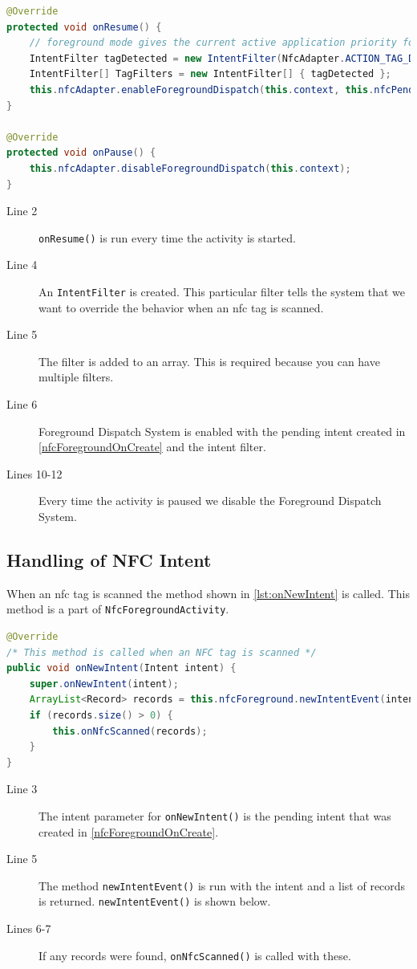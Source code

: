 \begin{lstlisting}[language=java, caption=Enable Foreground Dispatch System]
@Override
protected void onResume() {
	// foreground mode gives the current active application priority for reading scanned tags
	IntentFilter tagDetected = new IntentFilter(NfcAdapter.ACTION_TAG_DISCOVERED); 
	IntentFilter[] TagFilters = new IntentFilter[] { tagDetected };
	this.nfcAdapter.enableForegroundDispatch(this.context, this.nfcPendingIntent, TagFilters);
}

@Override
protected void onPause() {
    this.nfcAdapter.disableForegroundDispatch(this.context);
}
\end{lstlisting}
\begin{description}
\item[Line 2] \lstinline|onResume()| is run every time the activity is started.
\item[Line 4] An \lstinline|IntentFilter| is created. This particular filter tells the system that we want to override the behavior when an \ac{nfc} tag is scanned.
\item[Line 5] The filter is added to an array. This is required because you can have multiple filters.
\item[Line 6] Foreground Dispatch System is enabled with the pending intent created in \autoref{nfcForegroundOnCreate} and the intent filter.
\item[Lines 10-12] Every time the activity is paused we disable the Foreground Dispatch System.
\end{description}

\subsection*{Handling of NFC Intent}
When an \ac{nfc} tag is scanned the method shown in \autoref{lst:onNewIntent} is called. This method is a part of \lstinline|NfcForegroundActivity|.
\begin{lstlisting}[language=java, label=lst:onNewIntent, caption=\lstinline|onNewIntent()| method]
@Override
/* This method is called when an NFC tag is scanned */
public void onNewIntent(Intent intent) { 
    super.onNewIntent(intent);
    ArrayList<Record> records = this.nfcForeground.newIntentEvent(intent);
    if (records.size() > 0) {
        this.onNfcScanned(records);
    }
}  
\end{lstlisting}
\begin{description}
\item[Line 3] The intent parameter for \lstinline|onNewIntent()| is the pending intent that was created in \autoref{nfcForegroundOnCreate}.
\item[Line 5] The method \lstinline|newIntentEvent()| is run with the intent and a list of records is returned. \lstinline|newIntentEvent()| is shown below.
\item[Lines 6-7] If any records were found, \lstinline|onNfcScanned()| is called with these.
\end{description}

